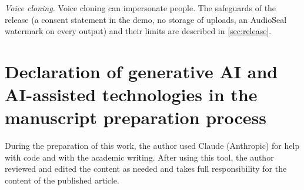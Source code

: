 \emph{Voice cloning.} Voice cloning can impersonate people. The safeguards of the release (a consent statement in the
demo, no storage of uploads, an AudioSeal watermark on every output) and their limits are described in
\cref{sec:release}.

\section*{Declaration of generative AI and AI-assisted technologies in the manuscript preparation process}
During the preparation of this work, the author used Claude (Anthropic) for help with code and with the academic
writing. After using this tool, the author reviewed and edited the content as needed and takes full responsibility for
the content of the published article.

